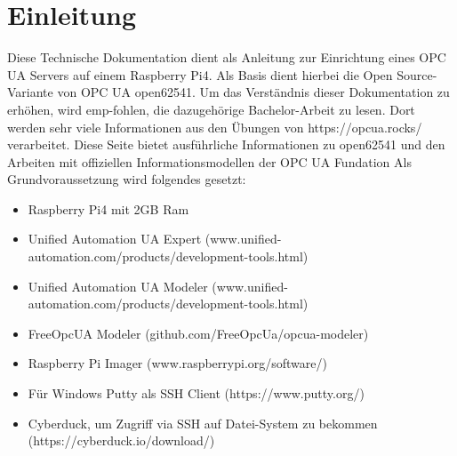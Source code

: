 \section{Einleitung} \label{sec:einleitung}
Diese Technische Dokumentation dient als Anleitung zur Einrichtung eines OPC UA Servers auf einem Raspberry Pi4. Als Basis dient hierbei die Open Source-Variante von OPC UA open62541. Um das Verständnis dieser Dokumentation zu erhöhen, wird emp-fohlen, die dazugehörige Bachelor-Arbeit zu lesen. Dort werden sehr viele Informationen aus den Übungen von https://opcua.rocks/ verarbeitet. Diese Seite bietet ausführliche Informationen zu open62541 und den Arbeiten mit offiziellen Informationsmodellen der OPC UA Fundation
Als Grundvoraussetzung wird folgendes gesetzt:
\begin{itemize}
	\item Raspberry Pi4 mit 2GB Ram
	\item Unified Automation UA Expert 
	(www.unified-automation.com/products/development-tools.html)
	\item Unified Automation UA Modeler 
	(www.unified-automation.com/products/development-tools.html)
	\item FreeOpcUA Modeler (github.com/FreeOpcUa/opcua-modeler)
	\item Raspberry Pi Imager (www.raspberrypi.org/software/)
	\item Für Windows Putty als SSH Client
	(https://www.putty.org/)
	\item Cyberduck, um Zugriff via SSH auf Datei-System zu bekommen
	(https://cyberduck.io/download/) 
\end{itemize}

